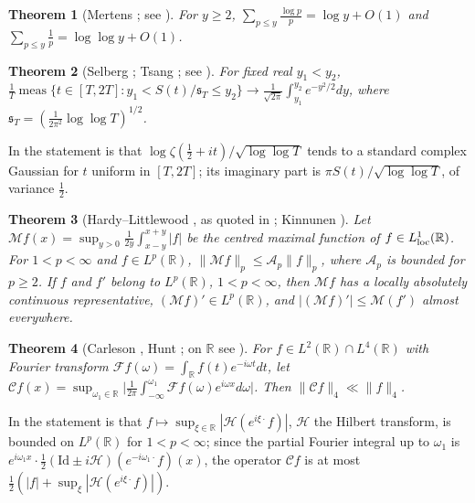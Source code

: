 \documentclass[preprint,12pt]{elsarticle}
\numberwithin{equation}{section}
\theoremstyle{plain}
\newtheorem{theorem}{Theorem}[section]
\theoremstyle{definition}
\theoremstyle{remark}
\newcommand{\R}{\mathbb R}
\begin{document}
\begin{theorem}[Mertens {\cite{Mertens1874}}; see {\cite[Ch.~I.1, Thms.~1.8 and 1.10]{Tenenbaum2015}}]\label{thm:known_mertens}
For $y\ge2$, $\sum_{p\le y}\frac{\log p}p=\log y+O(1)$ and $\sum_{p\le y}\frac1p=\log\log y+O(1)$.
\end{theorem}

\begin{theorem}[Selberg {\cite{Selberg1946a}}; Tsang {\cite{Tsang1984}}; see {\cite[(1.1)]{FazzariGerspachMinelli2025}}]\label{thm:known_selberg_clt}
For fixed real $y_1<y_2$, $\frac1T\operatorname{meas}\{t\in[T,2T]:y_1<S(t)/\mathfrak s_T\le y_2\}\to\frac1{\sqrt{2\pi}}\int_{y_1}^{y_2}e^{-y^2/2}dy$, where $\mathfrak s_T=(\frac1{2\pi^2}\log\log T)^{1/2}$.
\end{theorem}
In \cite{FazzariGerspachMinelli2025} the statement is that $\log\zeta(\frac12+it)/\sqrt{\log\log T}$ tends to a standard complex Gaussian for $t$ uniform in $[T,2T]$; its imaginary part is $\pi S(t)/\sqrt{\log\log T}$, of variance $\frac12$.

\begin{theorem}[Hardy--Littlewood {\cite[Thm.~I.1]{Stein1970}}, as quoted in {\cite[(1.2)]{Kinnunen1997}}; Kinnunen {\cite[Thm.~1.4]{Kinnunen1997}}]\label{thm:known_maximal}
Let $\mathcal Mf(x)=\sup_{y>0}\frac1{2y}\int_{x-y}^{x+y}|f|$ be the centred maximal function of $f\in L^1_{\rm loc}(\R)$. For $1<p<\infty$ and $f\in L^p(\R)$, $\|\mathcal Mf\|_p\le\mathcal A_p\|f\|_p$, where $\mathcal A_p$ is bounded for $p\ge2$. If $f$ and $f'$ belong to $L^p(\R)$, $1<p<\infty$, then $\mathcal Mf$ has a locally absolutely continuous representative, $(\mathcal Mf)'\in L^p(\R)$, and $|(\mathcal Mf)'|\le\mathcal M(f')$ almost everywhere.
\end{theorem}

\begin{theorem}[Carleson {\cite{Carleson1966}}, Hunt {\cite{Hunt1968}}; on $\R$ see {\cite{Lerner2013}}]\label{thm:known_carleson}
For $f\in L^2(\R)\cap L^4(\R)$ with Fourier transform $\mathcal Ff(\omega)=\int_\R f(t)e^{-i\omega t}dt$, let $\mathcal Cf(x)=\sup_{\omega_1\in\R}\bigl|\frac1{2\pi}\int_{-\infty}^{\omega_1}\mathcal Ff(\omega)e^{i\omega x}d\omega\bigr|$. Then $\|\mathcal Cf\|_4\ll\|f\|_4$.
\end{theorem}
In \cite{Lerner2013} the statement is that $f\mapsto\sup_{\xi\in\R}|\mathcal H(e^{i\xi\cdot}f)|$, $\mathcal H$ the Hilbert transform, is bounded on $L^p(\R)$ for $1<p<\infty$; since the partial Fourier integral up to $\omega_1$ is $e^{i\omega_1x}\cdot\frac12(\mathrm{Id}\pm i\mathcal H)(e^{-i\omega_1\cdot}f)(x)$, the operator $\mathcal Cf$ is at most $\frac12(|f|+\sup_\xi|\mathcal H(e^{i\xi\cdot}f)|)$.
\end{document}
